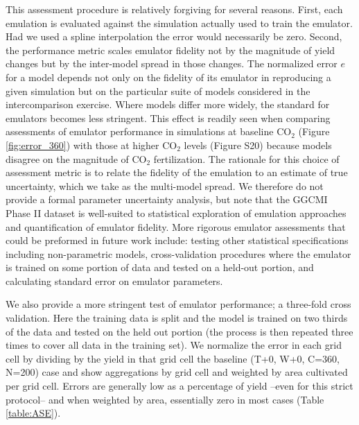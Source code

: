 \documentclass[esd, manuscript]{copernicus} %
\begin{document}
This assessment procedure is relatively forgiving for several reasons. First, each emulation is evaluated against the simulation actually used to train the emulator. Had we used a spline interpolation the error would necessarily be zero. Second, the performance metric scales emulator fidelity not by the magnitude of yield changes but by the inter-model spread in those changes. The normalized error $e$ for a model depends not only on the fidelity of its emulator in reproducing a given simulation but on the particular suite of models considered in the intercomparison exercise. Where models differ more widely, the standard for emulators becomes less stringent. This effect is readily seen when comparing assessments of emulator performance in simulations at baseline CO$_2$ (Figure \ref{fig:error_360}) with those at higher CO$_2$ levels (Figure S20) because models disagree on the magnitude of CO$_2$ fertilization. The rationale for this choice of assessment metric is to relate the fidelity of the emulation to an estimate of true uncertainty, which we take as the multi-model spread. We therefore do not provide a formal parameter uncertainty analysis, but note that the GGCMI Phase II dataset is well-suited to statistical exploration of emulation approaches and quantification of emulator fidelity. More rigorous emulator assessments that could be preformed in future work include: testing other statistical specifications including non-parametric models, cross-validation procedures where the emulator is trained on some portion of data and tested on a held-out portion, and calculating standard error on emulator parameters.

We also provide a more stringent test of emulator performance; a three-fold cross validation. Here the training data is split and the model is trained on two thirds of the data and tested on the held out portion (the process is then repeated three times to cover all data in the training set). We normalize the error in each grid cell by dividing by the yield in that grid cell the baseline (T+0, W+0, C=360, N=200) case and show aggregations by grid cell and weighted by area cultivated per grid cell. Errors are generally low as a percentage of yield --even for this strict protocol-- and when weighted by area, essentially zero in most cases (Table \ref{table:ASE}).
\end{document}
